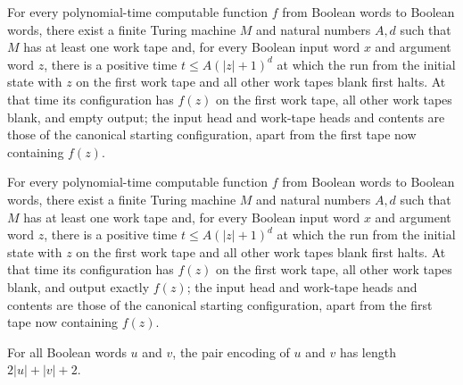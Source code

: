 \begin{lemma}
\label{Complexity.satClean_install}
\leanok
{}
For every polynomial-time computable function $f$ from Boolean words to Boolean words,
there exist a finite Turing machine $M$ and natural numbers $A,d$ such that $M$ has at
least one work tape and, for every Boolean input word $x$ and argument word $z$, there
is a positive time $t\le A(|z|+1)^d$ at which the run from the initial state with $z$ on
the first work tape and all other work tapes blank first halts. At that time its
configuration has $f(z)$ on the first work tape, all other work tapes blank, and empty
output; the input head and work-tape heads and contents are those of the canonical
starting configuration, apart from the first tape now containing $f(z)$.
\end{lemma}

\begin{lemma}
\label{Complexity.satClean_emit}
\leanok
{}
For every polynomial-time computable function $f$ from Boolean words to Boolean words,
there exist a finite Turing machine $M$ and natural numbers $A,d$ such that $M$ has at
least one work tape and, for every Boolean input word $x$ and argument word $z$, there
is a positive time $t\le A(|z|+1)^d$ at which the run from the initial state with $z$ on
the first work tape and all other work tapes blank first halts. At that time its
configuration has $f(z)$ on the first work tape, all other work tapes blank, and output
exactly $f(z)$; the input head and work-tape heads and contents are those of the
canonical starting configuration, apart from the first tape now containing $f(z)$.
\end{lemma}

\begin{lemma}
\label{Complexity.satPair_length}
\leanok
{}
For all Boolean words $u$ and $v$, the pair encoding of $u$ and $v$ has length
$2|u|+|v|+2$.
\end{lemma}

